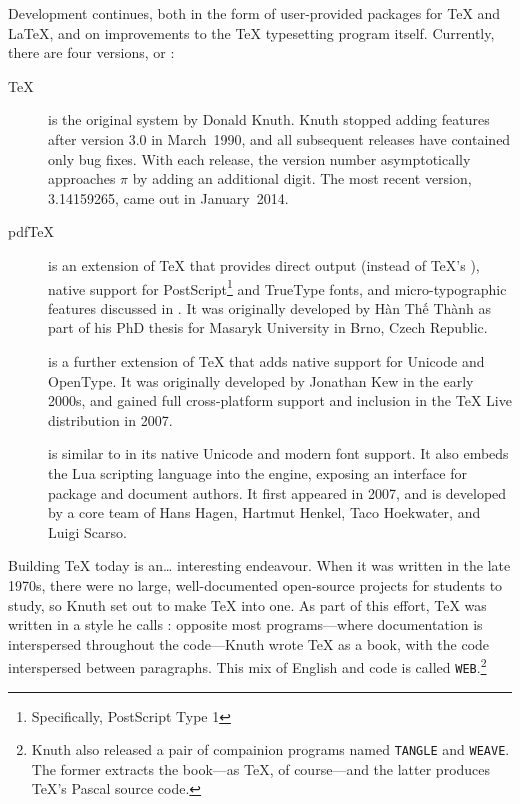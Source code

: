 Development continues,
both in the form of user-provided packages for \TeX{} and \LaTeX{},
and on improvements to the \TeX{} typesetting program itself.
Currently, there are four versions, or :
\begin{description}
\item[\TeX] is the original system by Donald Knuth.
Knuth stopped adding features after version 3.0 in March~1990,
and all subsequent releases have contained only bug fixes.
With each release, the version number asymptotically approaches $\pi$
by adding an additional digit.
The most recent version, 3.14159265, came out in January~2014.

\item[pdf\TeX] is an extension of \TeX{} that provides direct 
    output (instead of \TeX's ),
    native support for PostScript\footnote{%
    Specifically, PostScript Type 1}
    and TrueType fonts,
    and micro-typographic features discussed in .
    It was originally developed by
    Hàn Thế Thành
    as part of his PhD thesis
    for Masaryk University in Brno, Czech Republic.\punckern{}

\item[\XeTeX] is a further extension of \TeX{} that adds native support for
    Unicode and OpenType.
    It was originally developed by Jonathan Kew in the early 2000s,
    and gained full cross-platform support and inclusion in the \TeX{} Live
    distribution in 2007.\punckern{}

\item[\LuaTeX] is similar to \XeTeX{} in its native Unicode and modern font support.
    It also embeds the Lua scripting language into the engine,
    exposing an interface for package and document authors.
    It first appeared in 2007, and is developed by a core team of
    Hans Hagen, Hartmut Henkel, Taco Hoekwater,
    and Luigi Scarso.\punckern{}
\end{description}

Building \TeX{} today is an\ldots{} interesting endeavour.
When it was written in the late 1970s,
there were no large, well-documented open-source projects for students to study,
so Knuth set out to make \TeX{} into one.
As part of this effort, \TeX{} was written in a style he calls
: opposite most programs---where
documentation is interspersed throughout the code---Knuth wrote \TeX{} as a book,
with the code interspersed between paragraphs.
This mix of English and code is called \texttt{WEB}.\punckern\footnote{Knuth
also released a pair of compainion programs named
\texttt{TANGLE} and \texttt{WEAVE}.
The former extracts the book---as \TeX, of course---and the latter
produces \TeX's Pascal source code.}

